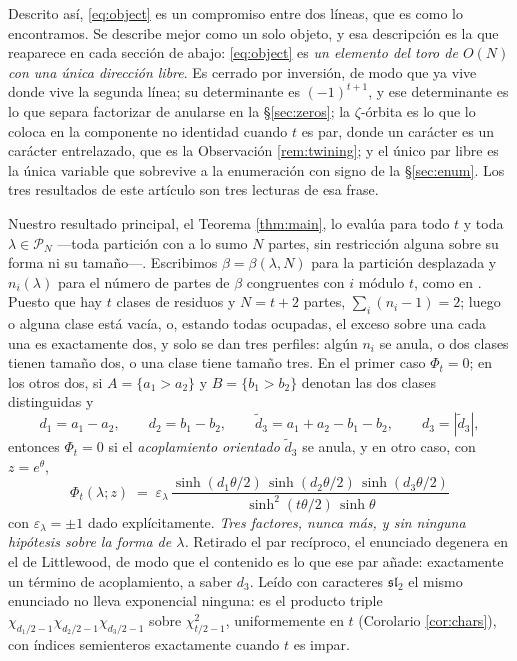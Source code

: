 \documentclass[11pt,reqno]{amsart}
\theoremstyle{plain}
\theoremstyle{definition}
\newcommand{\PP}{\mathcal{P}}
\begin{document}
Descrito así, \eqref{eq:object} es un compromiso entre dos líneas, que es como lo encontramos. Se
describe mejor como un solo objeto, y esa descripción es la que reaparece en cada sección de abajo:
\eqref{eq:object} es \emph{un elemento del toro de $O(N)$ con una única dirección libre}. Es cerrado
por inversión, de modo que ya vive donde vive la segunda línea; su determinante es $(-1)^{t+1}$, y
ese determinante es lo que separa factorizar de anularse en la \S\ref{sec:zeros}; la $\zeta$-órbita
es lo que lo coloca en la componente no identidad cuando $t$ es par, donde un carácter es un carácter
entrelazado, que es la Observación \ref{rem:twining}; y el único par libre es la única variable que
sobrevive a la enumeración con signo de la \S\ref{sec:enum}. Los tres resultados de este artículo son
tres lecturas de esa frase.

Nuestro resultado principal, el Teorema \ref{thm:main},
lo evalúa para todo $t$ y toda $\lambda\in\PP_N$ ---toda partición con a lo sumo $N$ partes, sin
restricción alguna sobre su forma ni su tamaño---. Escribimos $\beta=\beta(\lambda,N)$ para la partición
desplazada y $n_i(\lambda)$ para el número de partes de $\beta$ congruentes con $i$ módulo $t$, como
en \cite{AK22}. Puesto que hay $t$ clases de residuos y $N=t+2$ partes, $\sum_i(n_i-1)=2$; luego o
alguna clase está vacía, o, estando todas ocupadas, el exceso sobre una cada una es exactamente dos,
y solo se dan tres perfiles: algún $n_i$ se anula, o dos clases tienen tamaño dos, o una clase tiene
tamaño tres. En el primer caso $\Phi_t=0$; en los otros dos, si $A=\{a_1>a_2\}$ y $B=\{b_1>b_2\}$
denotan las dos clases distinguidas y
\[
d_1=a_1-a_2,\qquad d_2=b_1-b_2,\qquad
\tilde d_3=a_1+a_2-b_1-b_2,\qquad d_3=|\tilde d_3| ,
\]
entonces $\Phi_t=0$ si el \emph{acoplamiento orientado} $\tilde d_3$ se anula, y en otro caso, con
$z=e^{\theta}$,
\[
\boxed{\;\;\Phi_t(\lambda;z)\;=\;\varepsilon_\lambda\,
\frac{\sinh(d_1\theta/2)\,\sinh(d_2\theta/2)\,\sinh(d_3\theta/2)}
{\sinh^2(t\theta/2)\,\sinh\theta}\;\;}
\]
con $\varepsilon_\lambda=\pm1$ dado explícitamente. \emph{Tres factores, nunca más, y sin ninguna
hipótesis sobre la forma de $\lambda$.} Retirado el par recíproco, el enunciado degenera en el de
Littlewood, de modo que el contenido es lo que ese par añade: exactamente un término de
acoplamiento, a saber $d_3$. Leído con caracteres $\mathfrak{sl}_2$ el mismo enunciado no lleva
exponencial ninguna: es el producto triple $\chi_{d_1/2-1}\chi_{d_2/2-1}\chi_{d_3/2-1}$ sobre
$\chi_{t/2-1}^2$, uniformemente en $t$ (Corolario \ref{cor:chars}), con índices semienteros
exactamente cuando $t$ es impar.
\end{document}
